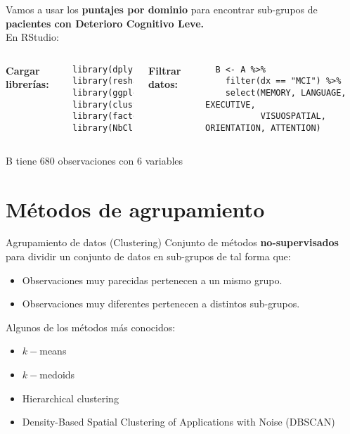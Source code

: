 \documentclass[10pt, aspectratio=169]{beamer}
\begin{document}
\begin{frame}[fragile]{}
 Vamos a usar los \textbf{puntajes por dominio} para encontrar sub-grupos de \textbf{pacientes con Deterioro Cognitivo Leve.}\\
 \vspace{0.4cm}
 \pause
 En RStudio:\\
 \vspace{0.3cm}
 \begin{columns}[t]
 \pause
 \textcolor{UltraViolet}{\textbf{Cargar librerías:}}\\
 \vspace{-0.2cm}
 \begin{verbatim}
library(dplyr)
library(reshape2)
library(ggplot2)
library(cluster)
library(factoextra)
library(NbClust)
 \end{verbatim}
 \pause
 \textcolor{UltraViolet}{\textbf{Filtrar datos:}}\\
 \vspace{-0.2cm}
 \begin{verbatim}
  B <- A %>%
    filter(dx == "MCI") %>%
    select(MEMORY, LANGUAGE, EXECUTIVE, 
           VISUOSPATIAL, ORIENTATION, ATTENTION)
 \end{verbatim}
 \end{columns}
 B tiene 680 observaciones con 6 variables
\end{frame}

\section{Métodos de agrupamiento}

\begin{frame}[fragile]{Agrupamiento de datos (Clustering)}
Conjunto de métodos \textbf{no-supervisados} para dividir un conjunto de datos en sub-grupos de tal forma que:
\begin{itemize}
 \item Observaciones muy parecidas pertenecen a un mismo grupo.
 \item Observaciones muy diferentes pertenecen a distintos sub-grupos.
\end{itemize}
\vspace{0.4cm}
\pause
Algunos de los métodos más conocidos:
 \begin{itemize}
  \item \textcolor<3>{PinkPeacock}{$k-$means} 
  \item $k-$medoids
  \item Hierarchical clustering
  \item Density-Based Spatial Clustering of Applications with Noise (DBSCAN) 
 \end{itemize}
\end{frame}
\end{document}
